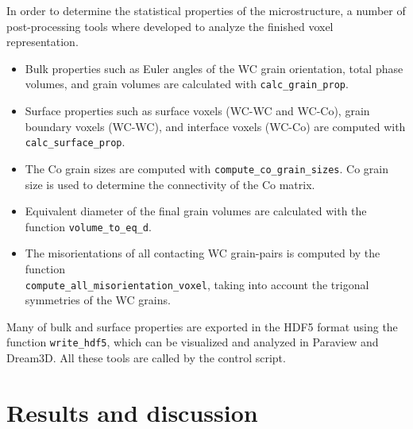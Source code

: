 \documentclass[3p,12pt]{elsarticle}
\begin{document}
In order to determine the statistical properties of the microstructure, a number of post-processing tools where developed to analyze the finished voxel representation.
\begin{itemize}
 \item Bulk properties such as Euler angles of the WC grain orientation, total phase volumes, and grain volumes are calculated with \verb+calc_grain_prop+.
 \item Surface properties such as surface voxels (WC-WC and WC-Co), grain boundary voxels (WC-WC), and interface voxels (WC-Co) are computed with \verb+calc_surface_prop+.
 \item The Co grain sizes are computed with \verb+compute_co_grain_sizes+. Co grain size is used to determine the connectivity of the Co matrix.
 \item Equivalent diameter of the final grain volumes are calculated with the function \verb+volume_to_eq_d+.
 \item The misorientations of all contacting WC grain-pairs is computed by the function \\ \verb+compute_all_misorientation_voxel+, taking into account the trigonal symmetries of the WC grains.
\end{itemize}
Many of bulk and surface properties are exported in the HDF5 format using the function \verb+write_hdf5+, which can be visualized and analyzed in Paraview and Dream3D.
All these tools are called by the control script.


\section{Results and discussion}
\label{sec:results}
\end{document}
